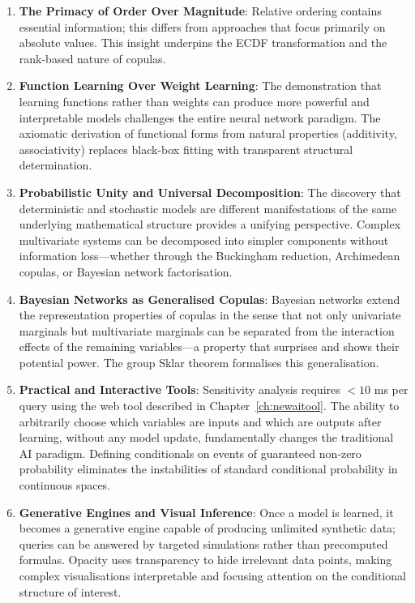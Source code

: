 \begin{enumerate}
\item \textbf{The Primacy of Order Over Magnitude}: Relative ordering contains essential information; this differs from approaches that focus primarily on absolute values. This insight underpins the ECDF transformation and the rank-based nature of copulas.

\item \textbf{Function Learning Over Weight Learning}: The demonstration that learning functions rather than weights can produce more powerful and interpretable models challenges the entire neural network paradigm. The axiomatic derivation of functional forms from natural properties (additivity, associativity) replaces black-box fitting with transparent structural determination.

\item \textbf{Probabilistic Unity and Universal Decomposition}: The discovery that deterministic and stochastic models are different manifestations of the same underlying mathematical structure provides a unifying perspective. Complex multivariate systems can be decomposed into simpler components without information loss—whether through the Buckingham reduction, Archimedean copulas, or Bayesian network factorisation.

\item \textbf{Bayesian Networks as Generalised Copulas}: Bayesian networks extend the representation properties of copulas in the sense that not only univariate marginals but multivariate marginals can be separated from the interaction effects of the remaining variables—a property that surprises and shows their potential power. The group Sklar theorem formalises this generalisation.

\item \textbf{Practical and Interactive Tools}: Sensitivity analysis requires \(<10\) ms per query using the web tool described in Chapter~\ref{ch:newaitool}. The ability to arbitrarily choose which variables are inputs and which are outputs after learning, without any model update, fundamentally changes the traditional AI paradigm. Defining conditionals on events of guaranteed non‑zero probability eliminates the instabilities of standard conditional probability in continuous spaces.

\item \textbf{Generative Engines and Visual Inference}: Once a model is learned, it becomes a generative engine capable of producing unlimited synthetic data; queries can be answered by targeted simulations rather than precomputed formulas. Opacity uses transparency to hide irrelevant data points, making complex visualisations interpretable and focusing attention on the conditional structure of interest.
\end{enumerate}

